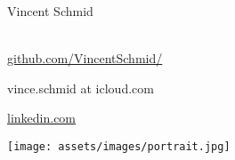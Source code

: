 \vspace{0pt}
\begin{minipage}[t]{0.6\textwidth}
    \vspace{0pt}
    {\sectionfont\fontsize{20}{30}\selectfont\color{black}
        Vincent Schmid\\[0.2em]
    }
    {\sectionfont\fontsize{13}{14}\selectfont\color{altColor}
        \\[0.6em]
    }
    \begin{minipage}[t]{0.58\linewidth}
        \begin{description}[labelwidth=1em]
            \item[\faGithub\color{altColor}] \href{https://github.com/VincentSchmid/}{github.com/VincentSchmid/}
            \item[\faEnvelopeO\color{altColor}] vince.schmid at icloud.com
        \end{description}
        \vspace{.5em}
    \end{minipage}
    \hfill
    \begin{minipage}[t]{0.38\linewidth}
        \begin{description}[labelwidth=1em]
            \item[\faLinkedin\color{altColor}] \href{https://www.linkedin.com/in/vincent-schmid-b931787a/}{linkedin.com}

        \end{description}
    \end{minipage}
\end{minipage}
\hfill
\begin{minipage}[t]{0.38\textwidth}
    \vspace{0pt}
    \hfill\texttt{[image: assets/images/portrait.jpg]}
    \vspace{1em}
\end{minipage}
